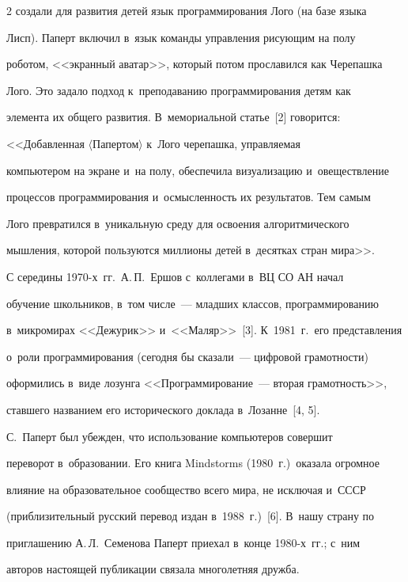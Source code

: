 \begin{multicols}{2}
создали для развития детей язык программирования Лого (на базе языка 


Лисп). Паперт включил в~язык команды управления рисующим на полу 


роботом, <<экранный аватар>>, который потом прославился как Черепашка 


Лого. Это задало подход к~преподаванию программирования детям как 


элемента их общего развития. В~мемориальной статье~[2] говорится: 


<<Добавленная $\langle$Папертом$\rangle$ к~Лого черепашка, управляемая 


компьютером на экране и~на полу, обеспечила визуализацию и~овеществление 


процессов программирования и~осмыс\-лен\-ность их результатов. Тем самым 


Лого превратился в~уникальную среду для освоения алгоритмического 


мышления, которой пользуются миллионы детей в~десятках стран мира>>.


  


  С середины 1970-х~гг.\ А.\,П.~Ершов с~коллегами в~ВЦ СО АН начал 


обучение школьников, в~том чис\-ле~---  младших классов, программированию 


в~мик\-ро\-ми\-рах <<Дежурик>> и~<<Маляр>>~[3]. К~1981~г.\ его представления 


о~роли программирования (сегодня  бы сказали~--- цифровой грамотности) 


оформились в~виде лозунга <<Программирование~--- вторая грамотность>>, 


ставшего названием его исторического доклада в~Лозанне~[4, 5].


  


  С.~Паперт был убежден, что использование компьютеров совершит 


переворот в~образовании. Его книга Mindstorms (1980~г.)\ оказала огромное 


влияние на образовательное сообщество всего мира, не исключая и~СССР 


(приблизительный русский перевод издан в~1988~г.)~[6]. В~нашу страну по 


приглашению А.\,Л.~Семенова Паперт приехал в~конце 1980-х~гг.; с~ним 


авторов настоящей публикации связала многолетняя дружба.



\end{multicols}
